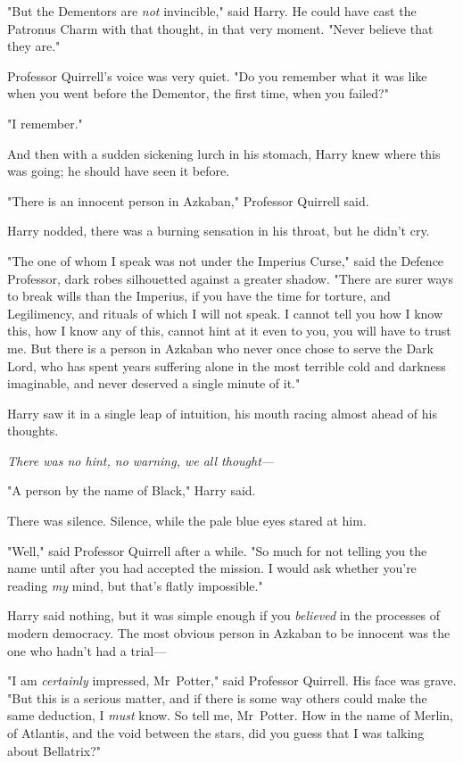 "But the Dementors are \emph{not} invincible," said Harry. He could have cast
the Patronus Charm with that thought, in that very moment. "Never believe that
they are."

Professor Quirrell’s voice was very quiet. "Do you remember what it was like
when you went before the Dementor, the first time, when you failed?"

"I remember."

And then with a sudden sickening lurch in his stomach, Harry knew where this
was going; he should have seen it before.

"There is an innocent person in Azkaban," Professor Quirrell said.

Harry nodded, there was a burning sensation in his throat, but he didn’t cry.

"The one of whom I speak was not under the Imperius Curse," said the Defence
Professor, dark robes silhouetted against a greater shadow. "There are surer
ways to break wills than the Imperius, if you have the time for torture, and
Legilimency, and rituals of which I will not speak. I cannot tell you how I
know this, how I know any of this, cannot hint at it even to you, you will have
to trust me. But there is a person in Azkaban who never once chose to serve the
Dark Lord, who has spent years suffering alone in the most terrible cold and
darkness imaginable, and never deserved a single minute of it."

Harry saw it in a single leap of intuition, his mouth racing almost ahead of
his thoughts.

\emph{There was no hint, no warning, we all thought—}

"A person by the name of Black," Harry said.

There was silence. Silence, while the pale blue eyes stared at him.

"Well," said Professor Quirrell after a while. "So much for not telling you the
name until after you had accepted the mission. I would ask whether you’re
reading \emph{my} mind, but that’s flatly impossible."

Harry said nothing, but it was simple enough if you \emph{believed} in the
processes of modern democracy. The most obvious person in Azkaban to be
innocent was the one who hadn’t had a trial—

"I am \emph{certainly} impressed, Mr~Potter," said Professor Quirrell. His
face was grave. "But this is a serious matter, and if there is some way others
could make the same deduction, I \emph{must} know. So tell me, Mr~Potter. How
in the name of Merlin, of Atlantis, and the void between the stars, did you
guess that I was talking about Bellatrix?"
